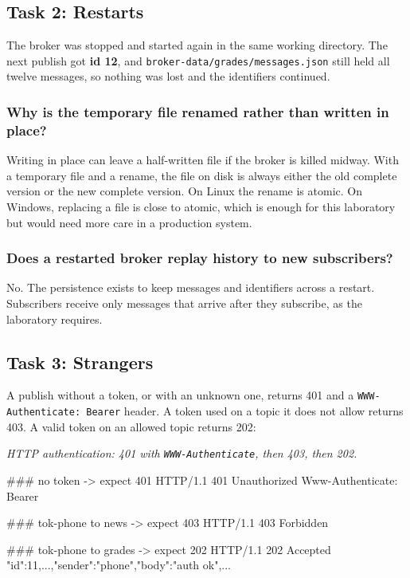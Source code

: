 \documentclass[12pt,a4paper]{article}
\begin{document}
\subsection{Task 2: Restarts}
The broker was stopped and started again in the same working directory. The next
publish got \textbf{id 12}, and \texttt{broker-data/grades/messages.json} still
held all twelve messages, so nothing was lost and the identifiers continued.

\subsubsection{Why is the temporary file renamed rather than written in place?}
Writing in place can leave a half-written file if the broker is killed midway.
With a temporary file and a rename, the file on disk is always either the old
complete version or the new complete version. On Linux the rename is atomic. On
Windows, replacing a file is close to atomic, which is enough for this laboratory
but would need more care in a production system.

\subsubsection{Does a restarted broker replay history to new subscribers?}
No. The persistence exists to keep messages and identifiers across a restart.
Subscribers receive only messages that arrive after they subscribe, as the
laboratory requires.

\subsection{Task 3: Strangers}
A publish without a token, or with an unknown one, returns 401 and a
\texttt{WWW-Authenticate: Bearer} header. A token used on a topic it does not
allow returns 403. A valid token on an allowed topic returns 202:

\par\medskip\noindent\textit{HTTP authentication: 401 with \texttt{WWW-Authenticate}, then 403, then 202.}\par\nopagebreak
\begin{terminalwindow}[]
### no token -> expect 401
HTTP/1.1 401 Unauthorized
Www-Authenticate: Bearer

### tok-phone to news -> expect 403
HTTP/1.1 403 Forbidden

### tok-phone to grades -> expect 202
HTTP/1.1 202 Accepted
{"id":11,...,"sender":"phone","body":"auth ok",...}
\end{terminalwindow}
\end{document}
